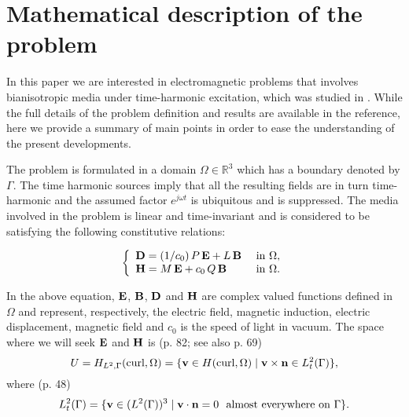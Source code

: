 \section{Mathematical description of the problem}
In this paper we are interested in electromagnetic problems that involves 
bianisotropic media under time-harmonic excitation, which was studied in 
\cite{kalarickel2020well}.
While the full details of the problem definition and results are available 
in the reference, here we provide a summary of main points in order to 
ease the understanding of the present developments.

The problem is formulated in a domain $\Omega \in \mathbb{R}^3$ 
which has a boundary denoted by $\Gamma$.
The time harmonic sources imply that all the resulting fields 
are in turn time-harmonic and the assumed factor $e^{j\omega t}$ is 
ubiquitous and is suppressed.
The media involved in the problem is linear and time-invariant and 
is considered to be satisfying the following constitutive relations:

    \begin{equation} \label{eq:constitutiveeqn}
      \left\{
        \begin{array}{ll}
          {\bf D} = (1/c_0) \, P \, {\bf E} + L \, {\bf B} 
            & \mbox{ in } \Omega,\\
          {\bf H} = M \, {\bf E} + c_0 \, Q \, {\bf B} 
            & \mbox{ in } \Omega.\\
        \end{array}
      \right.
    \end{equation}

In the above equation, ${\bf E}$, ${\bf B}$, ${\bf D}$ and ${\bf H}$ are 
complex valued functions defined in $\Omega$ and represent, respectively, 
the electric field, magnetic induction, electric displacement, magnetic field 
and $c_0$ is the speed of light in vacuum. 
The space where we will seek ${\bf E}$ and ${\bf H}$ is 
\cite{monkbook} (p. 82; see also p. 69)
%
\begin{equation}
  U=H_{L^2,\Gamma}(\mathrm{curl},\Omega) =
    \{ {\bf v} \in H(\mathrm{curl},\Omega) \; | \;
    {\bf v} \times {\bf n} \in L_t^2(\Gamma) \},
\end{equation}
%
where \cite{monkbook} (p. 48)
%
\begin{equation}
  L_t^2(\Gamma) = \{ {\bf v} \in (L^2(\Gamma))^3 \;|\;
    {\bf v} \cdot {\bf n} = 0 \ \textrm{ almost everywhere on }\Gamma\}.
\end{equation}

